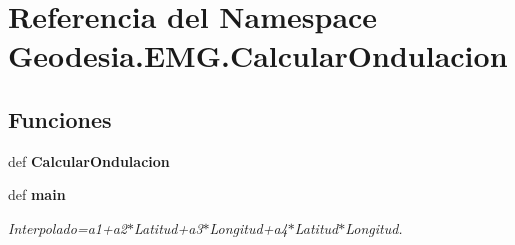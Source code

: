 \section{Referencia del Namespace Geodesia.\-E\-M\-G.\-Calcular\-Ondulacion}
\label{namespaceGeodesia_1_1EMG_1_1CalcularOndulacion}
\subsection*{Funciones}
\begin{DoxyCompactItemize}
\item 
def {\bf Calcular\-Ondulacion}
\item 
def {\bf main}
\begin{DoxyCompactList}\small\item\em Interpolado=a1+a2$\ast$\-Latitud+a3$\ast$\-Longitud+a4$\ast$\-Latitud$\ast$\-Longitud. \end{DoxyCompactList}\end{DoxyCompactItemize}
